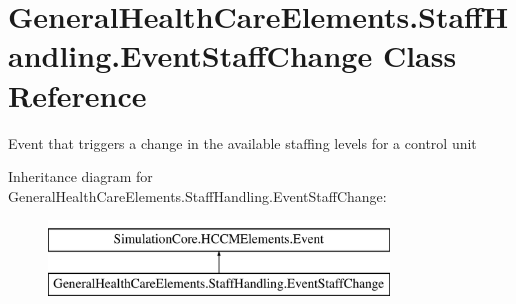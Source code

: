 \hypertarget{class_general_health_care_elements_1_1_staff_handling_1_1_event_staff_change}{}\section{General\+Health\+Care\+Elements.\+Staff\+Handling.\+Event\+Staff\+Change Class Reference}
\label{class_general_health_care_elements_1_1_staff_handling_1_1_event_staff_change}


Event that triggers a change in the available staffing levels for a control unit  


Inheritance diagram for General\+Health\+Care\+Elements.\+Staff\+Handling.\+Event\+Staff\+Change\+:\begin{figure}[H]
\begin{center}
\leavevmode
\includegraphics[height=2.000000cm]{class_general_health_care_elements_1_1_staff_handling_1_1_event_staff_change}
\end{center}
\end{figure}
